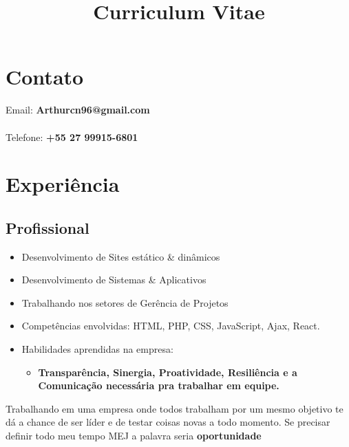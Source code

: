 \documentclass[10pt, a4paper, roman]{moderncv} %
\title{Curriculum Vitae}
\begin{document}
\makecvtitle %

\section{Contato}

\vspace{0.2cm}
\hspace{2cm} Email:  \textbf{Arthurcn96@gmail.com} \\  \\
\vspace{0.2cm}
\hspace{2cm}Telefone:  \textbf{+55 27 99915-6801} \\


\vspace{0.2cm}



\section{Experiência}

\subsection{Profissional}


\vspace{0.2cm}
{
    \begin{itemize}
      \item Desenvolvimento de Sites estático \& dinâmicos
    	\item Desenvolvimento de Sistemas \& Aplicativos
      \item Trabalhando nos setores de Gerência de Projetos
    	\item Competências envolvidas: HTML, PHP, CSS, JavaScript, Ajax, React.
      \item Habilidades aprendidas na empresa:
      \begin{itemize}
        \item \textbf{Transparência, Sinergia, Proatividade, Resiliência e a Comunicação necessária pra trabalhar em equipe.}
      \end{itemize}
    \end{itemize}
    Trabalhando em uma empresa onde todos trabalham por um mesmo objetivo te dá a chance de ser líder e de testar coisas novas a todo momento. Se precisar definir todo meu tempo MEJ a palavra seria \textbf{oportunidade}
}
\end{document}
